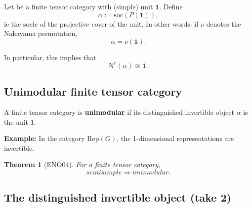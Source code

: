 \documentclass[11pt]{article}
\newtheorem{theorem}{Theorem}[section]
\theoremstyle{definition}
\begin{document}
Let be a finite tensor category with (simple) unit $\mathbf{1}$. Define
\begin{equation}
\alpha:= \mathrm{soc}(P(\mathbf{1})),
\end{equation}
ie the socle of the projective cover of the unit. In other words: if $\nu$ denotes the Nakayama permutation, $$  \alpha = \nu (\mathbf{1}). $$

In particular, this implies that 
$$ \mathsf{N}^r(\alpha) \cong \mathbf{1}.  $$

\subsection{Unimodular finite tensor category}
A finite tensor category is \textbf{unimodular} if its distinguished invertible object \( \alpha \) is the unit \( 1 \).

\textbf{Example:} In the category \( \mathrm{Rep}(G) \), the 1-dimensional representations are invertible.




\begin{theorem}[ENO04]
For a finite tensor category, $$ semisimple \Rightarrow unimodular.$$
\end{theorem}




\subsection{The distinguished invertible object (take 2)}
\end{document}
